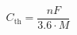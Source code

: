 \documentclass[preview]{standalone}
\begin{document}
\[C_\text{th} = \frac{nF}{3.6 \cdot M} \tag{1.12}\]
\end{document}
